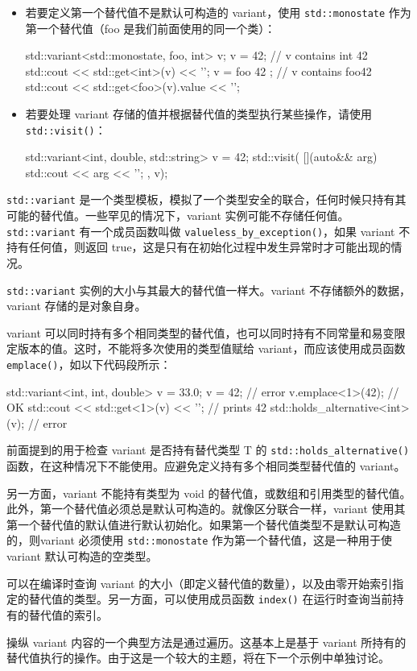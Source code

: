 \begin{itemize}
\item
若要定义第一个替代值不是默认可构造的 variant，使用 \verb|std::monostate| 作为第一个替代值（foo 是我们前面使用的同一个类）：

\begin{cpp}
std::variant<std::monostate, foo, int> v;
v = 42;        // v contains int 42
std::cout << std::get<int>(v) << '\n';
v = foo{ 42 }; // v contains foo{42}
std::cout << std::get<foo>(v).value << '\n';
\end{cpp}

\item
若要处理 variant 存储的值并根据替代值的类型执行某些操作，请使用 \verb|std::visit()|：

\begin{cpp}
std::variant<int, double, std::string> v = 42;
std::visit(
    [](auto&& arg) {std::cout << arg << '\n'; },
    v);
\end{cpp}
\end{itemize}


\verb|std::variant| 是一个类型模板，模拟了一个类型安全的联合，任何时候只持有其可能的替代值。一些罕见的情况下，variant 实例可能不存储任何值。\verb|std::variant| 有一个成员函数叫做 \verb|valueless_by_exception()|，如果 variant 不持有任何值，则返回 true，这是只有在初始化过程中发生异常时才可能出现的情况。

\verb|std::variant| 实例的大小与其最大的替代值一样大。variant 不存储额外的数据，variant 存储的是对象自身。

variant 可以同时持有多个相同类型的替代值，也可以同时持有不同常量和易变限定版本的值。这时，不能将多次使用的类型值赋给 variant，而应该使用成员函数 \verb|emplace()|，如以下代码段所示：

\begin{cpp}
std::variant<int, int, double> v = 33.0;
v = 42;                               // error
v.emplace<1>(42);                     // OK
std::cout << std::get<1>(v) << '\n';  // prints 42
std::holds_alternative<int>(v);       // error
\end{cpp}

前面提到的用于检查 variant 是否持有替代类型 T 的 \verb|std::holds_alternative()| 函数，在这种情况下不能使用。应避免定义持有多个相同类型替代值的 variant。

另一方面，variant 不能持有类型为 void 的替代值，或数组和引用类型的替代值。此外，第一个替代值必须总是默认可构造的。就像区分联合一样，variant 使用其第一个替代值的默认值进行默认初始化。如果第一个替代值类型不是默认可构造的，则variant 必须使用 \verb|std::monostate| 作为第一个替代值，这是一种用于使 variant 默认可构造的空类型。

可以在编译时查询 variant 的大小（即定义替代值的数量），以及由零开始索引指定的替代值的类型。另一方面，可以使用成员函数 \verb|index()| 在运行时查询当前持有的替代值的索引。


操纵 variant 内容的一个典型方法是通过遍历。这基本上是基于 variant 所持有的替代值执行的操作。由于这是一个较大的主题，将在下一个示例中单独讨论。

